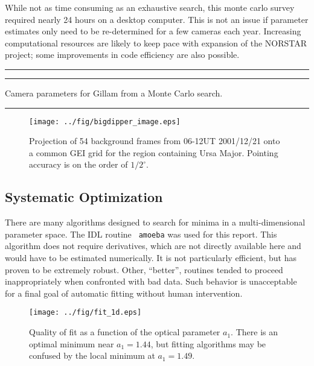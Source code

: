 \documentclass[11pt,twoside]{article}   %
\begin{document}
While not as time consuming as an exhaustive search, this monte
carlo survey required nearly 24 hours on a desktop computer.  This
is not an issue if parameter estimates only need to be
re-determined for a few cameras each year.  Increasing
computational resources are likely to keep pace with expansion of
the NORSTAR project; some improvements in code efficiency are also
possible.

 \begin{table}[htb!]
   \begin{center}
   \hrule
   \footnotesize
   
   \normalsize
   \hrule \vspace*{-3ex}
   \end{center}
     \caption[Initial values]
   {Camera parameters for Gillam from a Monte Carlo search.
     \label{tab:monte_values}  }
   \hrule
 \end{table}


\begin{figure}[htb!]
  \texttt{[image: ../fig/bigdipper\_image.eps]}
    \caption[Composite image of Ursa Major]
   {Projection of 54 background frames from 06-12UT 2001/12/21
   onto a common GEI grid for the region containing Ursa Major.
   Pointing accuracy is on the order of $1/2^\circ$.
     \label{fig:bigdipper}  }
\end{figure}


 \subsection{Systematic Optimization}
There are many algorithms designed to search for minima in a
multi-dimensional parameter space.  The {\sf IDL} routine {\tt
amoeba} \citep[see \S 10.4]{numerical_recipes} was used for this
report.  This algorithm does not require derivatives, which are
not directly available here and would have to be estimated
numerically.  It is not particularly efficient, but has proven to
be extremely robust.  Other, ``better'', routines tended to
proceed inappropriately when confronted with bad data.  Such
behavior is unacceptable for a final goal of automatic fitting
without human intervention.


\begin{figure}[htb!]
  \texttt{[image: ../fig/fit\_1d.eps]}
  \caption{Quality of fit as a function of the optical parameter $a_1$.
   There is an optimal minimum near $a_1=1.44$, but fitting algorithms
   may be confused by the local minimum at $a_1=1.49$.
     \label{fig:fit_1d}  }
\end{figure}
\end{document}
